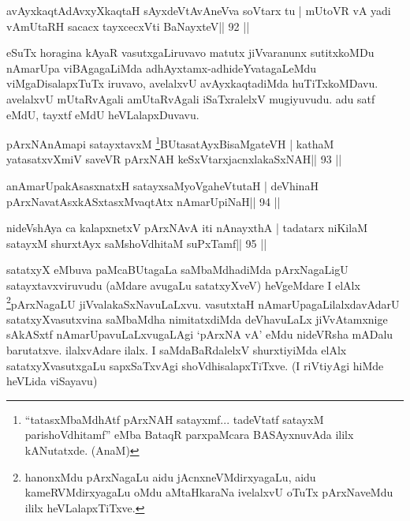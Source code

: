 \begin{shl}
avAyxkaqtAdAvxyXkaqtaH sAyxdeVtAvAneVva soV\s tarx tu |
mUtoVR vA yadi vA\s mUtaRH sacacx tayxcecxVti BaNayxteV\hfill || 92 ||
\end{shl}

\begin{artha}
eSuTx horagina kAyaR vasutxgaLiruvavo matutx jiVvaranunx sutitxkoMDu
nAmarUpa viBAgagaLiMda adhAyxtamx-adhideYvatagaLeMdu viMgaDisalapxTuTx
iruvavo, avelalxvU avAyxkaqtadiMda huTiTxkoMDavu. avelalxvU
mUtaRvAgali amUtaRvAgali iSaTxralelxV mugiyuvudu. adu satf eMdU,
tayxtf eMdU heVLalapxDuvavu.
\end{artha}


\begin{shl}
pArxNAnAmapi satayxtavxM \footnote{``tatasxMbaMdhAtf pArxNAH satayxmf... tadeVtatf satayxM parishoVdhitamf'' eMba BataqR parxpaMcara BASAyxnuvAda ililx kANutatxde. (AnaM)}BUtasatAyxBisaMgateVH |
kathaM yatasatxvXmiV saveVR pArxNAH keSxVtarxjacnxlakaSxNAH\hfill || 93 ||
\end{shl}

\begin{shl}
anAmarUpakAsasxnatxH satayxsaMyoVgaheVtutaH |
deVhinaH pArxNavatAsxkASxtasxMvaqtAtx nAmarUpiNaH\hfill || 94 ||
\end{shl}

\begin{shl}
nideVshAya ca kalapxnetxV pArxNAvA iti nAnayxthA |
tadatarx niKilaM satayxM shurxtAyx saMshoVdhitaM suPxTamf\hfill || 95 ||
\end{shl}

\begin{artha}
satatxyX eMbuva paMcaBUtagaLa saMbaMdhadiMda pArxNagaLigU
satayxtavxviruvudu (aMdare avugaLu satatxyXveV) heVgeMdare I
elAlx \footnote{hanonxMdu pArxNagaLu aidu jAcnxneVMdirxyagaLu, aidu
kameRVMdirxyagaLu oMdu aMtaHkaraNa ivelalxvU oTuTx pArxNaveMdu ililx
heVLalapxTiTxve.}pArxNagaLU jiVvalakaSxNavuLaLxvu. vasutxtaH
nAmarUpagaLilalxdavAdarU satatxyXvasutxvina saMbaMdha nimitatxdiMda
deVhavuLaLx jiVvAtamxnige sAkASxtf nAmarUpavuLaLxvugaLAgi `pArxNA vA'
eMdu nideVRsha mADalu barutatxve. ilalxvAdare ilalx. I saMdaBaRdalelxV
shurxtiyiMda elAlx satatxyXvasutxgaLu sapxSaTxvAgi
shoVdhisalapxTiTxve. (I riVtiyAgi hiMde heVLida viSayavu)
\end{artha}


